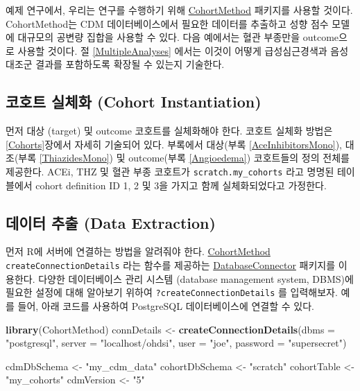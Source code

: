 \documentclass[11pt]{book}
\newenvironment{Shaded}{\begin{snugshade}}{\end{snugshade}}
\newcommand{\KeywordTok}[1]{\textcolor[rgb]{0.13,0.29,0.53}{\textbf{#1}}}
\newcommand{\DataTypeTok}[1]{\textcolor[rgb]{0.13,0.29,0.53}{#1}}
\newcommand{\StringTok}[1]{\textcolor[rgb]{0.31,0.60,0.02}{#1}}
\newcommand{\NormalTok}[1]{#1}
\theoremstyle{definition}
\theoremstyle{definition}
\theoremstyle{definition}
\theoremstyle{remark}
\begin{document}
예제 연구에서, 우리는 연구를 수행하기 위해
\href{https://ohdsi.github.io/CohortMethod/}{CohortMethod} 패키지를
사용할 것이다. CohortMethod는 CDM 데이터베이스에서 필요한 데이터를
추출하고 성향 점수 모델에 대규모의 공변량 집합을 사용할 수 있다. 다음
예에서는 혈관 부종만을 outcome으로 사용할 것이다. 절
\ref{MultipleAnalyses} 에서는 이것이 어떻게 급성심근경색과 음성 대조군
결과를 포함하도록 확장될 수 있는지 기술한다.

\subsection{코호트 실체화 (Cohort
Instantiation)}\label{--cohort-instantiation}

먼저 대상 (target) 및 outcome 코호트를 실체화해야 한다. 코호트 실체화
방법은 \ref{Cohorts}장에서 자세히 기술되어 있다. 부록에서 대상(부록
\ref{AceInhibitorsMono}), 대조(부록 \ref{ThiazidesMono}) 및 outcome(부록
\ref{Angioedema}) 코호트들의 정의 전체를 제공한다. ACEi, THZ 및 혈관
부종 코호트가 \texttt{scratch.my\_cohorts} 라고 명명된 테이블에서 cohort
definition ID 1, 2 및 3을 가지고 함께 실체화되었다고 가정한다.

\subsection{데이터 추출 (Data Extraction)}\label{--data-extraction-1}

먼저 R에 서버에 연결하는 방법을 알려줘야 한다.
\href{https://ohdsi.github.io/CohortMethod/}{CohortMethod}
\texttt{createConnectionDetails} 라는 함수를 제공하는
\href{https://ohdsi.github.io/DatabaseConnector/}{DatabaseConnector}
패키지를 이용한다. 다양한 데이터베이스 관리 시스템 (database management
system, DBMS)에 필요한 설정에 대해 알아보기 위하여
\texttt{?createConnectionDetails} 를 입력해보자. 예를 들어, 아래 코드를
사용하여 PostgreSQL 데이터베이스에 연결할 수 있다.

\begin{Shaded}
\begin{Highlighting}[]
\KeywordTok{library}\NormalTok{(CohortMethod)}
\NormalTok{connDetails <-}\StringTok{ }\KeywordTok{createConnectionDetails}\NormalTok{(}\DataTypeTok{dbms =} \StringTok{"postgresql"}\NormalTok{,}
                                       \DataTypeTok{server =} \StringTok{"localhost/ohdsi"}\NormalTok{,}
                                       \DataTypeTok{user =} \StringTok{"joe"}\NormalTok{,}
                                       \DataTypeTok{password =} \StringTok{"supersecret"}\NormalTok{)}

\NormalTok{cdmDbSchema <-}\StringTok{ "my_cdm_data"}
\NormalTok{cohortDbSchema <-}\StringTok{ "scratch"}
\NormalTok{cohortTable <-}\StringTok{ "my_cohorts"}
\NormalTok{cdmVersion <-}\StringTok{ "5"}
\end{Highlighting}
\end{Shaded}
\end{document}
